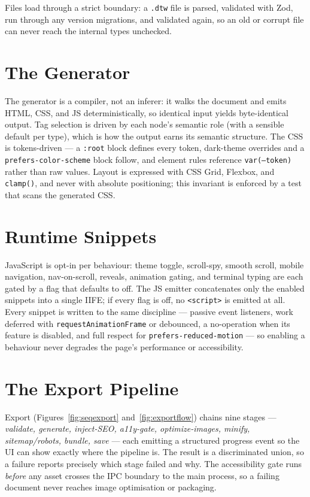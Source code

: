Files load through a strict boundary: a \texttt{.dtw} file is parsed, validated
with Zod, run through any version migrations, and validated again, so an old or
corrupt file can never reach the internal types unchecked.

\section{The Generator}
The generator is a compiler, not an inferer: it walks the document and emits
HTML, CSS, and JS deterministically, so identical input yields byte-identical
output. Tag selection is driven by each node's semantic role (with a sensible
default per type), which is how the output earns its semantic structure. The CSS is
tokens-driven --- a \texttt{:root} block defines every token, dark-theme overrides
and a \texttt{prefers-color-scheme} block follow, and element rules reference
\texttt{var(--token)} rather than raw values. Layout is expressed with CSS Grid,
Flexbox, and \texttt{clamp()}, and never with absolute positioning; this invariant
is enforced by a test that scans the generated CSS.

\section{Runtime Snippets}
JavaScript is opt-in per behaviour: theme toggle, scroll-spy, smooth scroll, mobile
navigation, nav-on-scroll, reveals, animation gating, and terminal typing are each
gated by a flag that defaults to off. The JS emitter concatenates only the enabled
snippets into a single IIFE; if every flag is off, no \texttt{<script>} is emitted
at all. Every snippet is written to the same discipline --- passive event
listeners, work deferred with \texttt{requestAnimationFrame} or debounced, a
no-operation when its feature is disabled, and full respect for
\texttt{prefers-reduced-motion} --- so enabling a behaviour never degrades the
page's performance or accessibility.

\section{The Export Pipeline}
Export (Figures~\ref{fig:seqexport} and~\ref{fig:exportflow}) chains nine stages
--- \emph{validate, generate, inject-SEO, a11y-gate, optimize-images, minify,
sitemap/robots, bundle, save} --- each emitting a structured progress event so the
UI can show exactly where the pipeline is. The result is a discriminated union, so
a failure reports precisely which stage failed and why. The accessibility gate runs
\emph{before} any asset crosses the IPC boundary to the main process, so a failing
document never reaches image optimisation or packaging.

